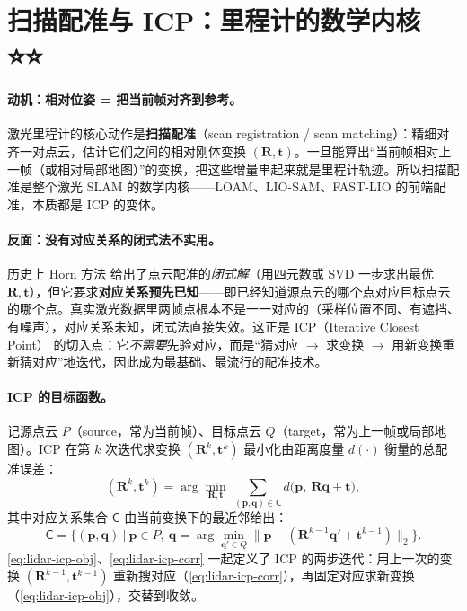 \section{扫描配准与 ICP：里程计的数学内核 ⭐⭐}
\label{sec:lidar-scan-reg}

\paragraph{动机：相对位姿 = 把当前帧对齐到参考。}
激光里程计的核心动作是\textbf{扫描配准}（scan registration / scan matching）：精细对齐一对点云，估计它们之间的相对刚体变换 $(\mathbf{R},\mathbf{t})$。一旦能算出“当前帧相对上一帧（或相对局部地图）”的变换，把这些增量串起来就是里程计轨迹。所以扫描配准是整个激光 SLAM 的数学内核——LOAM、LIO-SAM、FAST-LIO 的前端配准，本质都是 ICP 的变体。

\paragraph{反面：没有对应关系的闭式法不实用。}
历史上 Horn 方法\cite{horn1987closed} 给出了点云配准的\emph{闭式解}（用四元数或 SVD 一步求出最优 $\mathbf{R},\mathbf{t}$），但它要求\textbf{对应关系预先已知}——即已经知道源点云的哪个点对应目标点云的哪个点。真实激光数据里两帧点根本不是一一对应的（采样位置不同、有遮挡、有噪声），对应关系未知，闭式法直接失效。这正是 ICP（Iterative Closest Point）\cite{besl1992icp} 的切入点：它\emph{不需要}先验对应，而是“猜对应 $\to$ 求变换 $\to$ 用新变换重新猜对应”地迭代，因此成为最基础、最流行的配准技术。

\paragraph{ICP 的目标函数。}
记源点云 $P$（source，常为当前帧）、目标点云 $Q$（target，常为上一帧或局部地图）。ICP 在第 $k$ 次迭代求变换 $(\mathbf{R}^k,\mathbf{t}^k)$ 最小化由距离度量 $d(\cdot)$ 衡量的总配准误差\cite{carlone2026handbook}：
\begin{equation}
  (\mathbf{R}^k,\mathbf{t}^k)=\arg\min_{\mathbf{R},\mathbf{t}}\ \sum_{(\mathbf{p},\mathbf{q})\in\mathsf{C}} d\big(\mathbf{p},\ \mathbf{R}\mathbf{q}+\mathbf{t}\big),
  \label{eq:lidar-icp-obj}
\end{equation}
其中对应关系集合 $\mathsf{C}$ 由当前变换下的最近邻给出：
\begin{equation}
  \mathsf{C}=\Big\{(\mathbf{p},\mathbf{q})\ \Big|\ \mathbf{p}\in P,\ \mathbf{q}=\arg\min_{\mathbf{q}'\in Q}\big\|\mathbf{p}-(\mathbf{R}^{k-1}\mathbf{q}'+\mathbf{t}^{k-1})\big\|_2\Big\}.
  \label{eq:lidar-icp-corr}
\end{equation}
\cref{eq:lidar-icp-obj}、\cref{eq:lidar-icp-corr} 一起定义了 ICP 的两步迭代：用上一次的变换 $(\mathbf{R}^{k-1},\mathbf{t}^{k-1})$ 重新搜对应（\cref{eq:lidar-icp-corr}），再固定对应求新变换（\cref{eq:lidar-icp-obj}），交替到收敛。

